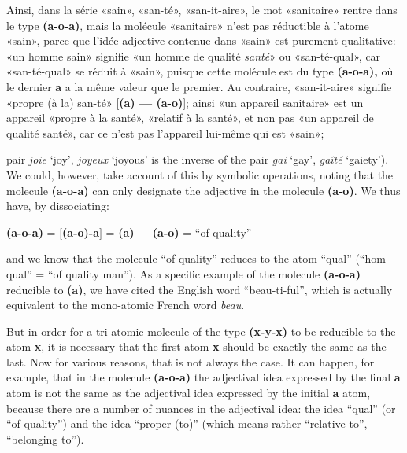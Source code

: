 \begin{sloppypar}
{{     Ainsi, dans la série «sain», «san-té», «san-it-aire», le mot
     «sanitaire» rentre dans le type \textbf{(a-o-a)}, mais la
     molécule «sanitaire» n’est pas réductible à l’atome «sain», parce
     que l’idée adjective contenue dans «sain» est purement
     qualitative: «un homme sain» signifie «un homme de qualité
     \emph{santé}» ou «san-té-qual», car «san-té-qual» se réduit à
     «sain», puisque cette molécule est du type \textbf{(a-o-a),} où
     le dernier \textbf{a} a la même valeur que le premier. Au
     contraire, «san-it-aire» signifie «propre (à la) san-té»
     [\textbf{(a) — (a-o)}]; ainsi «un appareil sanitaire» est un
     appareil «propre à la santé», «relatif à la santé», et non pas
     «un appareil de qualité santé», car ce n’est pas l’appareil
     lui-même qui est «sain»;}

 }
%
 {\noindent
   {\small
     pair \emph{joie} `joy', \emph{joyeux} `joyous' is the inverse of the
     pair \emph{gai} `gay', \emph{gaîté} `gaiety'). We could, however, take
     account of this by symbolic operations, noting that the molecule
     \textbf{(a-o-a)} can only designate the adjective in the molecule
     \textbf{(a-o)}. We thus have, by dissociating:

     \begin{center}
       \textbf{(a-o-a)} = {$\big[$\textbf{(a-o)-a}$\big]$} = \textbf{(a)} —
       \textbf{(a-o)} = ``of-quality''
     \end{center}
     and we know that the molecule ``of-quality'' reduces to the atom
     ``qual'' (``hom-qual'' = ``of quality man'').  As a specific
     example of the molecule \textbf{(a-o-a)} reducible to
     \textbf{(a)}, we have cited the English word ``beau-ti-ful'',
     which is actually equivalent to the mono-atomic French word
     \emph{beau}.

     But in order for a tri-atomic molecule of the type
     \textbf{(x-y-x)} to be reducible to the atom \textbf{x}, it is
     necessary that the first atom \textbf{x} should be exactly the
     same as the last. Now for various reasons, that is not always the
     case. It can happen, for example, that in the molecule
     \textbf{(a-o-a)} the adjectival idea expressed by the final
     \textbf{a} atom is not the same as the adjectival idea expressed
     by the initial \textbf{a} atom, because there are a number of
     nuances in the adjectival idea: the idea ``qual'' (or ``of
     quality'') and the idea ``proper (to)'' (which means rather
     ``relative to'', ``belonging to'').

}}
\end{sloppypar}
